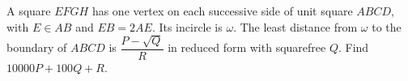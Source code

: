 A square $EFGH$ has one vertex on each successive side of unit square $ABCD$, with $E\in AB$ and $EB=2AE$. Its incircle is $\omega$. The least distance from $\omega$ to the boundary of $ABCD$ is $\dfrac{P-\sqrt Q}{R}$ in reduced form with squarefree $Q$. Find $10000P+100Q+R$.
